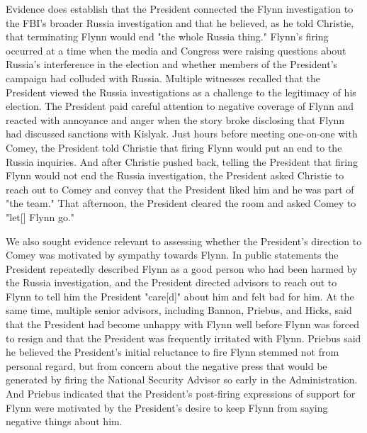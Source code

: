 Evidence does establish that the President connected the Flynn investigation to the FBI's broader Russia investigation and that he believed, as he told Christie, that terminating Flynn would end "the whole Russia thing."
Flynn's firing occurred at a time when the media and Congress were raising questions about Russia's interference in the election and whether members of the President's campaign had colluded with Russia.
Multiple witnesses recalled that the President viewed the Russia investigations as a challenge to the legitimacy of his election.
The President paid careful attention to negative coverage of Flynn and reacted with annoyance and anger when the story broke disclosing that Flynn had discussed sanctions with Kislyak.
Just hours before meeting one-on-one with Comey, the President told Christie that firing Flynn would put an end to the Russia inquiries.
And after Christie pushed back, telling the President that firing Flynn would not end the Russia investigation, the President asked Christie to reach out to Comey and convey that the President liked him and he was part of "the team."
That afternoon, the President cleared the room and asked Comey to "let[] Flynn go."

We also sought evidence relevant to assessing whether the President's direction to Comey was motivated by sympathy towards Flynn.
In public statements the President repeatedly described Flynn as a good person who had been harmed by the Russia investigation, and the President directed advisors to reach out to Flynn to tell him the President "care[d]" about him and felt bad for him.
At the same time, multiple senior advisors, including Bannon, Priebus, and Hicks, said that the President had become unhappy with Flynn well before Flynn was forced to resign and that the President was frequently irritated with Flynn.
Priebus said he believed the President's initial reluctance to fire Flynn stemmed not from personal regard, but from concern about the negative press that would be generated by firing the National Security Advisor so early in the Administration.
And Priebus indicated that the President's post-firing expressions of support for Flynn were motivated by the President's desire to keep Flynn from saying negative things about him.

